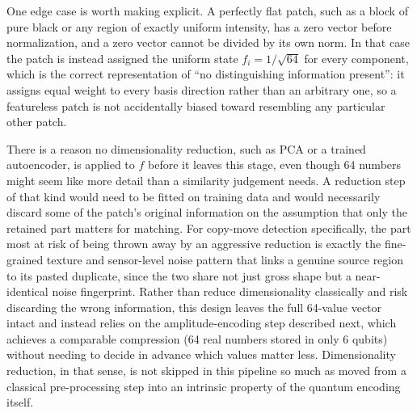 \documentclass[conference]{IEEEtran}
\begin{document}
One edge case is worth making explicit. A perfectly flat patch, such as a block of pure black or any region of exactly uniform intensity, has a zero vector before normalization, and a zero vector cannot be divided by its own norm. In that case the patch is instead assigned the uniform state $f_i = 1/\sqrt{64}$ for every component, which is the correct representation of ``no distinguishing information present'': it assigns equal weight to every basis direction rather than an arbitrary one, so a featureless patch is not accidentally biased toward resembling any particular other patch.

There is a reason no dimensionality reduction, such as PCA or a trained autoencoder, is applied to $f$ before it leaves this stage, even though 64 numbers might seem like more detail than a similarity judgement needs. A reduction step of that kind would need to be fitted on training data and would necessarily discard some of the patch's original information on the assumption that only the retained part matters for matching. For copy-move detection specifically, the part most at risk of being thrown away by an aggressive reduction is exactly the fine-grained texture and sensor-level noise pattern that links a genuine source region to its pasted duplicate, since the two share not just gross shape but a near-identical noise fingerprint. Rather than reduce dimensionality classically and risk discarding the wrong information, this design leaves the full 64-value vector intact and instead relies on the amplitude-encoding step described next, which achieves a comparable compression (64 real numbers stored in only 6 qubits) without needing to decide in advance which values matter less. Dimensionality reduction, in that sense, is not skipped in this pipeline so much as moved from a classical pre-processing step into an intrinsic property of the quantum encoding itself.
\end{document}
